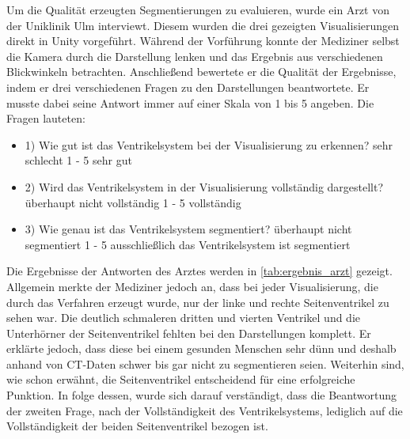Um die Qualität erzeugten Segmentierungen zu evaluieren, wurde ein Arzt von der Uniklinik Ulm interviewt. Diesem wurden die drei gezeigten Visualisierungen direkt in Unity vorgeführt. Während der Vorführung konnte der Mediziner selbst die Kamera durch die Darstellung lenken und das Ergebnis aus verschiedenen Blickwinkeln betrachten.
\newline
Anschließend bewertete er die Qualität der Ergebnisse, indem er drei verschiedenen Fragen zu den Darstellungen beantwortete. Er musste dabei seine Antwort immer auf einer Skala von 1 bis 5 angeben.
Die Fragen lauteten:
\begin{itemize}
	\item 1) Wie gut ist das Ventrikelsystem bei der Visualisierung zu erkennen? \newline sehr schlecht 1 - 5 sehr gut
	\item 2) Wird das Ventrikelsystem in der Visualisierung vollständig dargestellt? \newline überhaupt nicht vollständig 1 - 5 vollständig
	\item 3) Wie genau ist das Ventrikelsystem segmentiert? \newline überhaupt nicht segmentiert 1 - 5 ausschließlich das Ventrikelsystem ist segmentiert
\end{itemize}


Die Ergebnisse der Antworten des Arztes werden in \autoref{tab:ergebnis_arzt} gezeigt. Allgemein merkte der Mediziner jedoch an, dass bei jeder Visualisierung, die durch das Verfahren erzeugt wurde, nur der linke und rechte Seitenventrikel zu sehen war. Die deutlich schmaleren dritten und vierten Ventrikel und die Unterhörner der Seitenventrikel fehlten bei den Darstellungen komplett. Er erklärte jedoch, dass diese bei einem gesunden Menschen sehr dünn und deshalb anhand von CT-Daten schwer bis gar nicht zu segmentieren seien. Weiterhin sind, wie schon erwähnt, die Seitenventrikel entscheidend für eine erfolgreiche Punktion.
\newline
In folge dessen, wurde sich darauf verständigt, dass die Beantwortung der zweiten Frage, nach der Vollständigkeit des Ventrikelsystems, lediglich auf die Vollständigkeit der beiden Seitenventrikel bezogen ist.

\begin{table}[h]
\centering
\tiny
{}
\caption{Ergebnisse des Interviews mit einem Arzt}
\label{tab:ergebnis_arzt}
\end{table}


